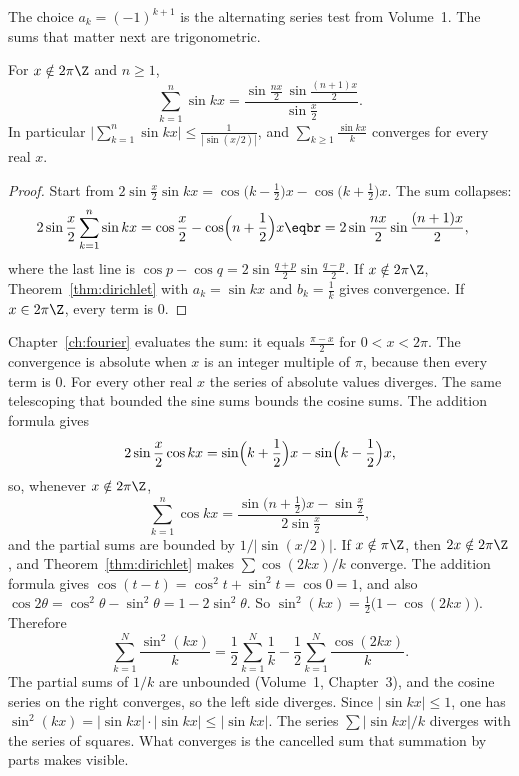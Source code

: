 The choice $a_k=(-1)^{k+1}$ is the alternating series test from Volume~1. The sums that matter next are trigonometric.

\begin{proposition}\label{prop:sinsum}
For $x\notin2\pi\Z$ and $n\ge1$,
\[
\sum_{k=1}^n\sin kx=\frac{\sin\frac{nx}2\,\sin\frac{(n+1)x}2}{\sin\frac x2}.
\]
In particular $\bigl|\sum_{k=1}^n\sin kx\bigr|\le\frac1{|\sin(x/2)|}$, and $\sum_{k\ge1}\frac{\sin kx}k$ converges for every real $x$.
\end{proposition}
\begin{proof}
Start from $2\sin\frac x2\sin kx=\cos\bigl(k-\frac12\bigr)x-\cos\bigl(k+\frac12\bigr)x$. The sum collapses:
\[
\begin{aligned}2\sin\frac x2\sum_{k=1}^n\sin kx&=\cos\frac x2-\cos\Bigl(n+\frac12\Bigr)x\eqbr=2\sin\frac{nx}2\sin\frac{(n+1)x}2,\end{aligned}
\]
where the last line is $\cos p-\cos q=2\sin\frac{q+p}2\sin\frac{q-p}2$. If $x\notin2\pi\Z$, Theorem~\ref{thm:dirichlet} with
$a_k=\sin kx$ and $b_k=\frac1k$ gives convergence. If $x\in2\pi\Z$, every term is $0$.
\end{proof}

Chapter~\ref{ch:fourier} evaluates the sum: it equals $\frac{\pi-x}2$ for $0<x<2\pi$. The convergence is absolute when $x$ is an integer multiple of $\pi$, because then every term is $0$. For every other real $x$ the series of absolute values diverges. The same telescoping that bounded the sine sums bounds the cosine sums. The addition formula gives
\[
2\sin\frac x2\cos kx=\sin\Bigl(k+\frac12\Bigr)x-\sin\Bigl(k-\frac12\Bigr)x,
\]
so, whenever $x\notin2\pi\Z$,
\[
\sum_{k=1}^n\cos kx=\frac{\sin\bigl(n+\frac12\bigr)x-\sin\frac x2}{2\sin\frac x2},
\]
and the partial sums are bounded by $1\big/\bigl|\sin(x/2)\bigr|$. If $x\notin\pi\Z$, then $2x\notin2\pi\Z$, and Theorem~\ref{thm:dirichlet} makes $\sum\cos(2kx)/k$ converge. The addition formula gives $\cos(t-t)=\cos^2 t+\sin^2 t=\cos0=1$, and also $\cos2\theta=\cos^2\theta-\sin^2\theta=1-2\sin^2\theta$. So $\sin^2(kx)=\frac12\bigl(1-\cos(2kx)\bigr)$. Therefore
\[
\sum_{k=1}^N\frac{\sin^2(kx)}k=\frac12\sum_{k=1}^N\frac1k-\frac12\sum_{k=1}^N\frac{\cos(2kx)}k.
\]
The partial sums of $1/k$ are unbounded (Volume~1, Chapter~3), and the cosine series on the right converges, so the left side diverges. Since $|\sin kx|\le1$, one has $\sin^2(kx)=|\sin kx|\cdot|\sin kx|\le|\sin kx|$. The series $\sum|\sin kx|/k$ diverges with the series of squares. What converges is the cancelled sum that summation by parts makes visible.

